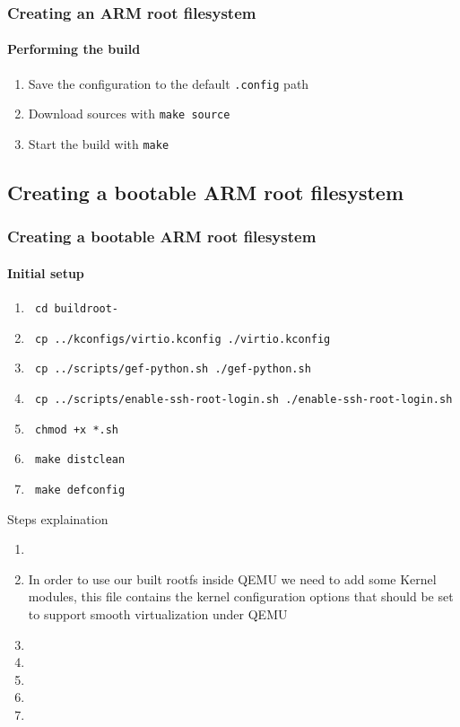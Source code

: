 \begin{frame}
  \frametitle{Creating an ARM root filesystem}
  \framesubtitle{Performing the build}
  \begin{enumerate}
    \item Save the configuration to the default \texttt{.config} path
    \item Download sources with \texttt{make source}
    \item Start the build with \texttt{make}
  \end{enumerate}
\end{frame}
\subsection{Creating a bootable ARM root filesystem}
\begin{frame}
  \frametitle{Creating a bootable ARM root filesystem}
  \framesubtitle{Initial setup}

  \begin{enumerate}
    \item \texttt{ cd buildroot-\buildrootLatestVersion }
    \item \texttt{ cp ../kconfigs/virtio.kconfig ./virtio.kconfig }
    \item \texttt{ cp ../scripts/gef-python.sh ./gef-python.sh }
    \item \texttt{ cp ../scripts/enable-ssh-root-login.sh ./enable-ssh-root-login.sh }
    \item \texttt{ chmod +x *.sh }
    \item \texttt{ make distclean }
    \item \texttt{ make defconfig }
  \end{enumerate}

\end{frame}
 {
  Steps explaination
  \begin{enumerate}
    \item \enteringBuildRootDirectoryDescription
    \item In order to use our built rootfs inside QEMU we need to add some Kernel modules,
      this file contains the kernel configuration options that should be set to support smooth virtualization under QEMU
    \item \gefPythonDescription
    \item \sshRootLoginDescription
    \item \scriptShouldBeExecutableDescription
    \item \makeCleanDescription
    \item \makeDefConfigDescription
  \end{enumerate}
}

